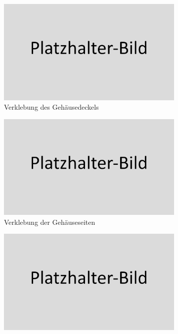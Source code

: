 \begin{figure}[h!tb]
	\begin{subfigure}[b]{0.5\linewidth}
		\centering
		\includegraphics[width=1\textwidth]{img/placeholder.png}
		\caption[Verklebung des Gehäusedeckels]{Verklebung des Gehäusedeckels}
		\label{fig:glued_parts_01}
	\end{subfigure}
	\begin{subfigure}[b]{0.5\linewidth}
		\centering
		\includegraphics[width=1\textwidth]{img/placeholder.png}
		\caption[Verklebung der Gehäuseseiten]{Verklebung der Gehäuseseiten}
	\label{fig:glued_parts_02}
	\end{subfigure}
	\begin{subfigure}[b]{0.5\linewidth}
		\centering
		\includegraphics[width=1\textwidth]{img/placeholder.png}

\end{subfigure}
\end{figure}
